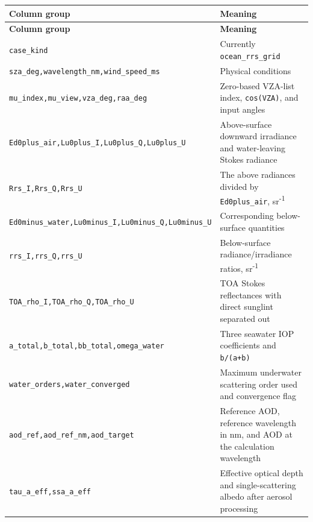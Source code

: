 {\TableFont
\begin{longtable}{@{}>{\raggedright\arraybackslash}p{}>{\raggedright\arraybackslash}p{}@{}}
\toprule
\textbf{Column group} & \textbf{Meaning} \\
\midrule
\endfirsthead
\toprule
\textbf{Column group} & \textbf{Meaning} \\
\midrule
\endhead
\bottomrule
\endfoot
\texttt{case\_\allowbreak{}kind} & Currently \texttt{ocean\_\allowbreak{}rrs\_\allowbreak{}grid} \\
\texttt{sza\_\allowbreak{}deg,\allowbreak{}wavelength\_\allowbreak{}nm,\allowbreak{}wind\_\allowbreak{}speed\_\allowbreak{}ms} & Physical conditions \\
\texttt{mu\_\allowbreak{}index,\allowbreak{}mu\_\allowbreak{}view,\allowbreak{}vza\_\allowbreak{}deg,\allowbreak{}raa\_\allowbreak{}deg} & Zero-based VZA-list index, \texttt{cos(VZA)}, and input angles \\
\texttt{Ed0plus\_\allowbreak{}air,\allowbreak{}Lu0plus\_\allowbreak{}I,\allowbreak{}Lu0plus\_\allowbreak{}Q,\allowbreak{}Lu0plus\_\allowbreak{}U} & Above-surface downward irradiance and water-leaving Stokes radiance \\
\texttt{Rrs\_\allowbreak{}I,\allowbreak{}Rrs\_\allowbreak{}Q,\allowbreak{}Rrs\_\allowbreak{}U} & The above radiances divided by \texttt{Ed0plus\_\allowbreak{}air}, sr\textsuperscript{-}\textsuperscript{1} \\
\texttt{Ed0minus\_\allowbreak{}water,\allowbreak{}Lu0minus\_\allowbreak{}I,\allowbreak{}Lu0minus\_\allowbreak{}Q,\allowbreak{}Lu0minus\_\allowbreak{}U} & Corresponding below-surface quantities \\
\texttt{rrs\_\allowbreak{}I,\allowbreak{}rrs\_\allowbreak{}Q,\allowbreak{}rrs\_\allowbreak{}U} & Below-surface radiance/irradiance ratios, sr\textsuperscript{-}\textsuperscript{1} \\
\texttt{TOA\_\allowbreak{}rho\_\allowbreak{}I,\allowbreak{}TOA\_\allowbreak{}rho\_\allowbreak{}Q,\allowbreak{}TOA\_\allowbreak{}rho\_\allowbreak{}U} & TOA Stokes reflectances with direct sunglint separated out \\
\texttt{a\_\allowbreak{}total,\allowbreak{}b\_\allowbreak{}total,\allowbreak{}bb\_\allowbreak{}total,\allowbreak{}omega\_\allowbreak{}water} & Three seawater IOP coefficients and \texttt{b/\allowbreak{}(a+b)} \\
\texttt{water\_\allowbreak{}orders,\allowbreak{}water\_\allowbreak{}converged} & Maximum underwater scattering order used and convergence flag \\
\texttt{aod\_\allowbreak{}ref,\allowbreak{}aod\_\allowbreak{}ref\_\allowbreak{}nm,\allowbreak{}aod\_\allowbreak{}target} & Reference AOD, reference wavelength in nm, and AOD at the calculation wavelength \\
\texttt{tau\_\allowbreak{}a\_\allowbreak{}eff,\allowbreak{}ssa\_\allowbreak{}a\_\allowbreak{}eff} & Effective optical depth and single-scattering albedo after aerosol processing \\
\end{longtable}
}


